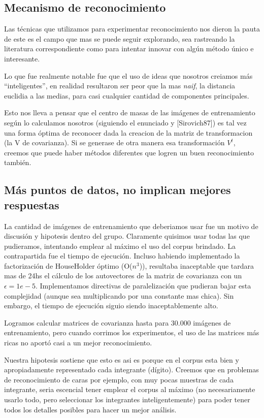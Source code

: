 \subsection{Mecanismo de reconocimiento}

Las t\'ecnicas que utilizamos para experimentar reconocimiento nos dieron
la pauta de  este es el campo que mas se puede seguir explorando, sea rastreando la literatura
correspondiente como para intentar innovar con alg\'un m\'etodo \'unico e interesante.

Lo que fue realmente notable fue que el uso de ideas que nosotros creiamos m\'as ``inteligentes'',
en realidad resultaron ser peor que la mas \textit{naif}, la distancia euclidia a las medias, para
casi cualquier cantidad de componentes principales.

Esto nos lleva a pensar que el centro de masas de las im\'agenes de entrenamiento seg\'un lo calculamos
nosotros (siguiendo el enunciado y [Sirovich87]) es tal vez una forma \'optima de reconocer
dada la creacion de la matriz de transformacion (la V de covarianza). Si se generase de otra manera esa
transformaci\'on $V^t$, creemos que puede haber m\'etodos diferentes que logren un buen reconocimiento tambi\'en.


\subsection{M\'as puntos de datos, no implican mejores respuestas}

La cantidad de im\'agenes de entrenamiento que deberiamos usar fue un motivo de discusi\'on y hipotesis
dentro del grupo. Claramente quisimos usar todas las que pudieramos, intentando emplear al m\'aximo el
uso del corpus brindado. La contrapartida fue el tiempo de ejecuci\'on. Incluso habiendo implementado
la factorizaci\'on de HouseHolder \'optimo (O($n^3$)), resultaba inaceptable que tardara mas de 24hs
el c\'alculo de los autovectores de la matriz de covarianza con un $\epsilon = 1e-5$. Implementamos
directivas de paralelizaci\'on que pudieran bajar esta complejidad (aunque sea multiplicando por una
constante mas chica). Sin embargo, el tiempo de ejecuci\'on siguio siendo inaceptablemente alto.

Logramos calcular matrices de covarianza hasta para 30.000 im\'agenes de entrenamiento, pero cuando
corrimos los experimentos, el uso de las matrices m\'as ricas no aport\'o casi a un mejor reconocimiento.

Nuestra hipotesis sostiene que esto es asi es porque en el corpus esta bien y apropiadamente
representado cada integrante (d\'igito). Creemos que en problemas de reconocimiento de caras por ejemplo, con
muy pocas muestras de cada integrante, seria escencial tener emplear el corpus al m\'aximo (no necesariamente
usarlo todo, pero seleccionar los integrantes inteligentemente) para poder tener todos los detalles
posibles para hacer un mejor an\'alisis.
